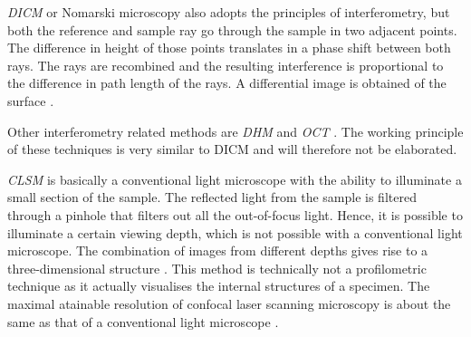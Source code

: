 \emph{\Gls{DICM}} or Nomarski microscopy also adopts the principles of interferometry, but both the reference and sample ray go through the sample in two adjacent points. The difference in height of those points translates in a phase shift between both rays. The rays are recombined and the resulting interference is proportional to the difference in path length of the rays. A differential image is obtained of the surface \citep{Lang}. \par
Other interferometry related methods are \emph{\gls{DHM}} \citep{Kemper2007a} and \emph{\gls{OCT}}  \citep{Podoleanu2012}. The working principle of these techniques is very similar to \gls{DICM} and will therefore not be elaborated. \par
  \emph{\Gls{CLSM}} is basically a conventional light microscope with the ability to illuminate a small section of the sample. The reflected light from the sample is filtered through a pinhole that filters out all the out-of-focus light. Hence, it is possible to illuminate a certain viewing depth, which is not possible with a conventional light microscope.  The combination of images from different depths gives rise to a three-dimensional structure \citep{Hocken2005}. This method is technically not a profilometric technique as it actually visualises the internal structures of a specimen. The maximal atainable resolution of confocal laser scanning microscopy is about the same as that of a conventional light microscope \citep{PawleyJBandMasters1996}. %
